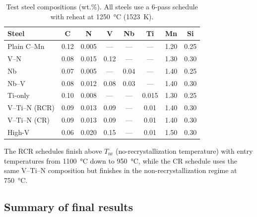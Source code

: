 \documentclass[11pt,a4paper]{article}
\begin{document}
\begin{table}[htbp]
\centering
\caption{Test steel compositions (wt.\%).  All steels use a 6-pass schedule
  with reheat at \SI{1250}{\degreeCelsius} (\SI{1523}{\kelvin}).}
\label{tab:comp}
\begin{tabular}{@{}lccccccc@{}}
\toprule
Steel & C & N & V & Nb & Ti & Mn & Si \\
\midrule
Plain C--Mn       & 0.12  & 0.005 & ---  & ---  & ---   & 1.20 & 0.25 \\
V--N              & 0.08  & 0.015 & 0.12 & ---  & ---   & 1.30 & 0.30 \\
Nb                & 0.07  & 0.005 & ---  & 0.04 & ---   & 1.40 & 0.25 \\
Nb--V             & 0.08  & 0.012 & 0.08 & 0.03 & ---   & 1.40 & 0.30 \\
Ti-only           & 0.10  & 0.008 & ---  & ---  & 0.015 & 1.30 & 0.25 \\
V--Ti--N (RCR)    & 0.09  & 0.013 & 0.09 & ---  & 0.01  & 1.40 & 0.30 \\
V--Ti--N (CR)     & 0.09  & 0.013 & 0.09 & ---  & 0.01  & 1.40 & 0.30 \\
High-V            & 0.06  & 0.020 & 0.15 & ---  & 0.01  & 1.50 & 0.30 \\
\bottomrule
\end{tabular}
\end{table}

The RCR schedules finish above
$T_\mathrm{nr}$ (no-recrystallization temperature) with entry temperatures
from \SI{1100}{\degreeCelsius} down to \SI{950}{\degreeCelsius},
while the CR schedule uses the same V--Ti--N composition but finishes in the
non-recrystallization regime at \SI{750}{\degreeCelsius}.

\subsection{Summary of final results}
\end{document}
